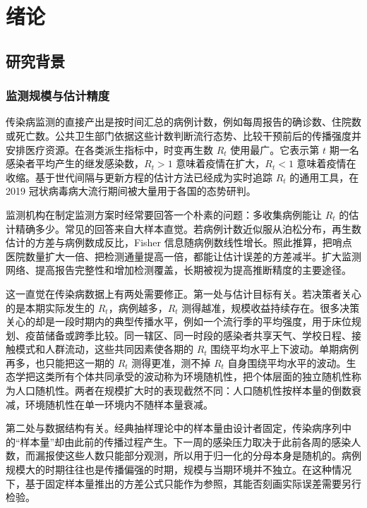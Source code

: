 \chapter{绪论}
\label{chap:intro}

\section{研究背景}
\label{sec:intro-background}

\subsection{监测规模与估计精度}

传染病监测的直接产出是按时间汇总的病例计数，例如每周报告的确诊数、住院数或死亡数。公共卫生部门依据这些计数判断流行态势、比较干预前后的传播强度并安排医疗资源。在各类派生指标中，时变再生数 $R_t$ 使用最广。它表示第 $t$ 期一名感染者平均产生的继发感染数，$R_t>1$ 意味着疫情在扩大，$R_t<1$ 意味着疫情在收缩。基于世代间隔与更新方程的估计方法已经成为实时追踪 $R_t$ 的通用工具\citep{wallinga2004different, fraser2007estimating, cori2013new}，在 2019 冠状病毒病大流行期间被大量用于各国的态势研判\citep{flaxman2020estimating, kucharski2020early}。

监测机构在制定监测方案时经常要回答一个朴素的问题：多收集病例能让 $R_t$ 的估计精确多少。常见的回答来自大样本直觉。若病例计数近似服从泊松分布，再生数估计的方差与病例数成反比，Fisher 信息随病例数线性增长\citep{parag2022quantifying}。照此推算，把哨点医院数量扩大一倍、把检测通量提高一倍，都能让估计误差的方差减半。扩大监测网络、提高报告完整性和增加检测覆盖，长期被视为提高推断精度的主要途径。

这一直觉在传染病数据上有两处需要修正。第一处与估计目标有关。若决策者关心的是本期实际发生的 $R_t$，病例越多，$R_t$ 测得越准，规模收益持续存在。很多决策关心的却是一段时期内的典型传播水平，例如一个流行季的平均强度，用于床位规划、疫苗储备或跨季比较。同一辖区、同一时段的感染者共享天气、学校日程、接触模式和人群流动，这些共同因素使各期的 $R_t$ 围绕平均水平上下波动\citep{dalziel2018urbanization, rasmussen2011inference}。单期病例再多，也只能把这一期的 $R_t$ 测得更准，测不掉 $R_t$ 自身围绕平均水平的波动。生态学把这类所有个体共同承受的波动称为环境随机性，把个体层面的独立随机性称为人口随机性\citep{engen1998demographic, rohani2002determinism}。两者在规模扩大时的表现截然不同：人口随机性按样本量的倒数衰减，环境随机性在单一环境内不随样本量衰减。

第二处与数据结构有关。经典抽样理论中的样本量由设计者固定，传染病序列中的“样本量”却由此前的传播过程产生。下一周的感染压力取决于此前各周的感染人数，而漏报使这些人数只能部分观测，所以用于归一化的分母本身是随机的。病例规模大的时期往往也是传播偏强的时期，规模与当期环境并不独立。在这种情况下，基于固定样本量推出的方差公式只能作为参照，其能否刻画实际误差需要另行检验。

